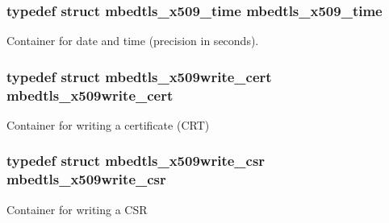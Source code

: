 \hypertarget{group__x509__module_ga38827540a02fb2ddca08ec0917a8a41b}{
\subsubsection[{mbedtls\-\_\-x509\-\_\-time}]{\setlength{\rightskip}{0pt plus 5cm}typedef struct {\bf mbedtls\-\_\-x509\-\_\-time}
 {\bf mbedtls\-\_\-x509\-\_\-time}}}\label{group__x509__module_ga38827540a02fb2ddca08ec0917a8a41b}
Container for date and time (precision in seconds). \hypertarget{group__x509__module_gacc3115587f8d882a7a137c38d6939e07}{
\subsubsection[{mbedtls\-\_\-x509write\-\_\-cert}]{\setlength{\rightskip}{0pt plus 5cm}typedef struct {\bf mbedtls\-\_\-x509write\-\_\-cert}
 {\bf mbedtls\-\_\-x509write\-\_\-cert}}}\label{group__x509__module_gacc3115587f8d882a7a137c38d6939e07}
Container for writing a certificate (C\-R\-T) \hypertarget{group__x509__module_ga7b0b4f8c5cfd541ee20c53907edb636d}{
\subsubsection[{mbedtls\-\_\-x509write\-\_\-csr}]{\setlength{\rightskip}{0pt plus 5cm}typedef struct {\bf mbedtls\-\_\-x509write\-\_\-csr}
 {\bf mbedtls\-\_\-x509write\-\_\-csr}}}\label{group__x509__module_ga7b0b4f8c5cfd541ee20c53907edb636d}
Container for writing a C\-S\-R 

